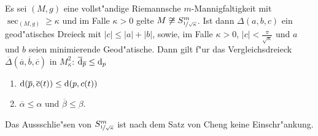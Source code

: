 \begin{Satz}\label{thm:satz-alexandrov-toponogov}
  Es sei $(M,g)$ eine vollst"andige Riemannsche $m$-Mannigfaltigkeit mit $\sec_{(M,g)} \geq \kappa$ und im Falle $\kappa > 0$ gelte $M \not\cong S^m_{\nicefrac{1}{\sqrt{\kappa}}}$.
  Ist dann $\Delta(a,b,c)$ ein geod"atisches Dreieck mit $|c| \leq |a| + |b|$, sowie, im Falle $\kappa > 0$, $|c| < \frac{\pi}{\sqrt{\kappa}}$ und $a$ und $b$ seien minimierende Geod"atische.
  Dann gilt f"ur das Vergleichsdreieck $\overline\Delta(\overline a,\overline b, \overline c)$ in $M_{\kappa}^2$: $\overline{\mathrm{d}}_{\overline{p}} \le \mathrm{d}_p$
  \begin{enumerate}[label=(\roman*)]
  \item $\mathrm{d}(\overline p,\overline c(t)) \leq \mathrm{d}(p,c(t))$
  \item $\overline \alpha \leq \alpha$ und $\overline \beta \leq \beta$.
  \end{enumerate}
\end{Satz}

\begin{center}\end{center}

\begin{bem}
  Das Aussschlie"sen von $S^m_{\nicefrac{1}{\sqrt{\kappa}}}$ ist nach dem Satz von Cheng\cite{Cheng1975} keine Einschr"ankung.
\end{bem}

